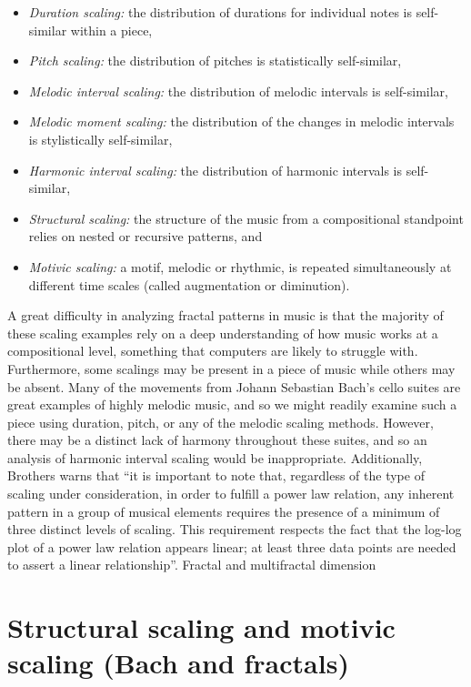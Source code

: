 \documentclass{article}
\begin{document}
\begin{itemize}
    \item \emph{Duration scaling:}
        the distribution of durations for individual notes is self-similar within a
        piece,
    \item \emph{Pitch scaling:}
        the distribution of pitches is statistically self-similar,
    \item \emph{Melodic interval scaling:}
        the distribution of melodic intervals is self-similar,
    \item \emph{Melodic moment scaling:}
        the distribution of the changes in melodic intervals is stylistically
        self-similar,
    \item \emph{Harmonic interval scaling:}
        the distribution of harmonic intervals is self-similar,
    \item \emph{Structural scaling:}
        the structure of the music from a compositional standpoint relies on nested
        or recursive patterns, and
    \item \emph{Motivic scaling:}
        a motif, melodic or rhythmic, is repeated simultaneously at different time
        scales (called augmentation or diminution).
\end{itemize}

A great difficulty in analyzing fractal patterns in music is that the majority
of these scaling examples rely on a deep understanding of how music works at a
compositional level, something that computers are likely to struggle with.
Furthermore, some scalings may be present in a piece of music while others may
be absent. Many of the movements from Johann Sebastian Bach’s cello suites are
great examples of highly melodic music, and so we might readily examine such a
piece using duration, pitch, or any of the melodic scaling methods. However,
there may be a distinct lack of harmony throughout these suites, and so an
analysis of harmonic interval scaling would be inappropriate.
%
Additionally,
Brothers warns that ``it is important to note that, regardless of the type of
scaling under consideration, in order to fulfill a power law relation, any
inherent pattern in a group of musical elements requires the presence of a
minimum of three distinct levels of scaling. This requirement respects the fact
that the log-log plot of a power law relation appears linear; at least three
data points are needed to assert a linear relationship''\cite{2}.
Fractal and multifractal dimension

\section{Structural scaling and motivic scaling (Bach and fractals)}
\end{document}

